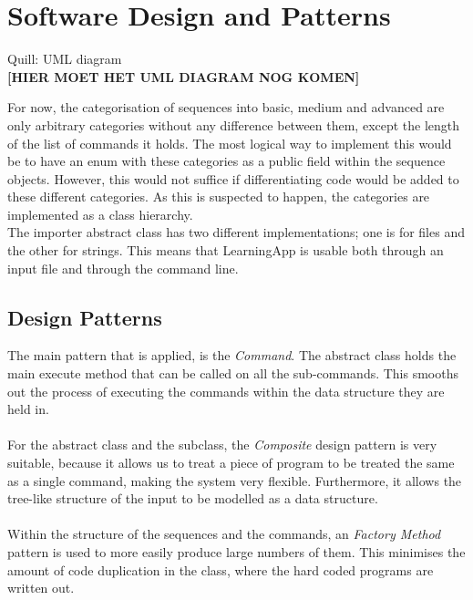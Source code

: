 \chapter{Software Design and Patterns}
Quill: UML diagram\\

\textbf{[HIER MOET HET UML DIAGRAM NOG KOMEN]}

For now, the categorisation of sequences into basic, medium and advanced are only arbitrary categories without any difference between them, except the length of the list of commands it holds. The most logical way to implement this would be to have an enum with these categories as a public field within the sequence objects. However, this would not suffice if differentiating code would be added to these different categories. As this is suspected to happen, the categories are implemented as a class hierarchy. \\
The importer abstract class has two different implementations; one is for files and the other for strings. This means that LearningApp is usable both through an input file and through the command line. 

\section{Design Patterns}
The main pattern that is applied, is the \textit{Command}. The  abstract class holds the main execute method that can be called on all the sub-commands. This smooths out the process of executing the commands within the data structure they are held in. \\~\\

For the  abstract class and the  subclass, the \textit{Composite} design pattern is very suitable, because it allows us to treat a piece of program to be treated the same as a single command, making the system very flexible. Furthermore, it allows the tree-like structure of the input to be modelled as a data structure. \\~\\

Within the structure of the sequences and the commands, an \textit{Factory Method} pattern is used to more easily produce large numbers of them. This minimises the amount of code duplication in the  class, where the hard coded programs are written out.\\~\\

